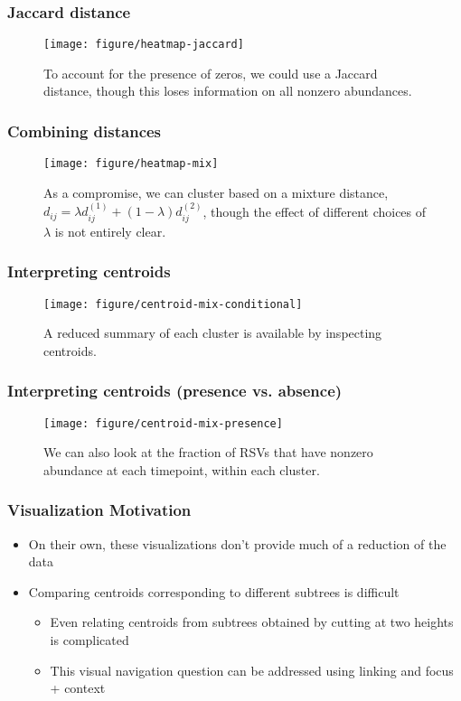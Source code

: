 \documentclass{beamer}
\begin{document}
\begin{frame}
  \frametitle{Jaccard distance}
 \begin{figure}[ht]
   \centering
   \texttt{[image: figure/heatmap-jaccard]}
   \caption{To account for the presence of zeros, we could use a Jaccard
     distance, though this loses information on all nonzero abundances.
     \label{fig:heatmap-jaccard} }
 \end{figure}
\end{frame}

\begin{frame}
  \frametitle{Combining distances}
 \begin{figure}[ht]
   \centering
   \texttt{[image: figure/heatmap-mix]}
   \caption{As a compromise, we can cluster based on a mixture distance, $d_{ij}
     = \lambda d^{(1)}_{ij} + \left(1 - \lambda\right)d^{(2)}_{ij}$, though the
    effect of different choices of $\lambda$ is not entirely clear.
     \label{fig:heatmap-jaccard} }
 \end{figure}
\end{frame}

\begin{frame}
  \frametitle{Interpreting centroids}
\begin{figure}[ht]
  \centering
  \texttt{[image: figure/centroid-mix-conditional]}
  \caption{A reduced summary of each cluster is available by inspecting
    centroids. \label{fig:centroid-mix-conditional} }
\end{figure}
\end{frame}

\begin{frame}
  \frametitle{Interpreting centroids (presence vs. absence)}
\begin{figure}[ht]
  \centering
  \texttt{[image: figure/centroid-mix-presence]}
  \caption{We can also look at the fraction of RSVs that have nonzero abundance
    at each timepoint, within each cluster. \label{fig:centroid-mix-presence} }
\end{figure}
\end{frame}

\begin{frame}
  \frametitle{Visualization Motivation}
  \begin{itemize}
  \item On their own, these visualizations don't provide much of a reduction of
    the data
  \item Comparing centroids corresponding to different subtrees is difficult
    \begin{itemize}
    \item Even relating centroids from subtrees obtained by cutting at two
      heights is complicated
    \item This visual navigation question can be addressed using linking and
      focus + context
    \end{itemize}
  \end{itemize}
\end{frame}
\end{document}
